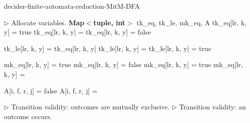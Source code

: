 \begin{algorithm}
  \caption{{\sc decider-finite-automata-reduction-MitM-DFA}}\label{alg:finite-automata-reduction-mitm_dfa}

  \begin{algorithmic}[1]
      \State \(\triangleright\) Allocate variables.
      \State\textbf{Map$\boldsymbol<$tuple, int$\boldsymbol>$} tk\_eq, tk\_le, mk\_eq, A
          tk\_eq[lr, k, y] = true
          tk\_eq[lr, k, y] = 
        \Else\;
          tk\_eq[lr, k, y] = false
        \EndIf

          tk\_le[lr, k, y] = tk\_eq[lr, k, y]
          tk\_le[lr, k, y] = 
        \Else\;
          tk\_le[lr, k, y] = true
        \EndIf

          mk\_eq[lr, k, y] = true
          mk\_eq[lr, k, y] = false
          mk\_eq[lr, k, y] = true
        \Else\;
          mk\_eq[lr, k, y] = 
        \EndIf
      \EndFor

          A[i, f, r, j] = false
        \Else\;
          A[i, f, r, j] = 
        \EndIf
      \EndFor

      \State \(\triangleright\) Transition validity: outcomes are mutually exclusive.
        \State {}
        \State {}
        \State {}
      \EndFor
      \State \(\triangleright\) Transition validity: an outcome occurs.
      \EndFor


\end{algorithmic}
\end{algorithm}
